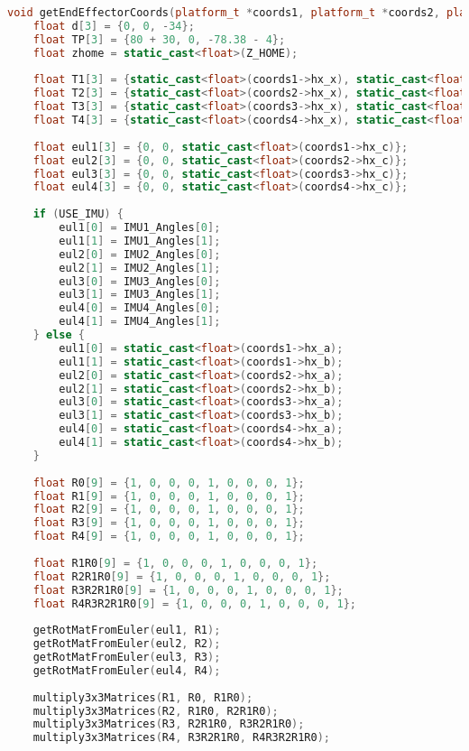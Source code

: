 \documentclass[12pt,a4paper]{report}
\begin{document}
\begin{lstlisting}[language=C++]
void getEndEffectorCoords(platform_t *coords1, platform_t *coords2, platform_t *coords3, platform_t *coords4, bool USE_IMU){
	float d[3] = {0, 0, -34};
	float TP[3] = {80 + 30, 0, -78.38 - 4};
	float zhome = static_cast<float>(Z_HOME);
	
	float T1[3] = {static_cast<float>(coords1->hx_x), static_cast<float>(coords1->hx_y), static_cast<float>(coords1->hx_z) + zhome};
	float T2[3] = {static_cast<float>(coords2->hx_x), static_cast<float>(coords2->hx_y), static_cast<float>(coords2->hx_z) + zhome};
	float T3[3] = {static_cast<float>(coords3->hx_x), static_cast<float>(coords3->hx_y), static_cast<float>(coords3->hx_z) + zhome};
	float T4[3] = {static_cast<float>(coords4->hx_x), static_cast<float>(coords4->hx_y), static_cast<float>(coords4->hx_z) + zhome};
	
	float eul1[3] = {0, 0, static_cast<float>(coords1->hx_c)};
	float eul2[3] = {0, 0, static_cast<float>(coords2->hx_c)};
	float eul3[3] = {0, 0, static_cast<float>(coords3->hx_c)};
	float eul4[3] = {0, 0, static_cast<float>(coords4->hx_c)};
	
	if (USE_IMU) {
		eul1[0] = IMU1_Angles[0];
		eul1[1] = IMU1_Angles[1];
		eul2[0] = IMU2_Angles[0];
		eul2[1] = IMU2_Angles[1];
		eul3[0] = IMU3_Angles[0];
		eul3[1] = IMU3_Angles[1];
		eul4[0] = IMU4_Angles[0];
		eul4[1] = IMU4_Angles[1];
	} else {
		eul1[0] = static_cast<float>(coords1->hx_a);
		eul1[1] = static_cast<float>(coords1->hx_b);
		eul2[0] = static_cast<float>(coords2->hx_a);
		eul2[1] = static_cast<float>(coords2->hx_b);
		eul3[0] = static_cast<float>(coords3->hx_a);
		eul3[1] = static_cast<float>(coords3->hx_b);
		eul4[0] = static_cast<float>(coords4->hx_a);
		eul4[1] = static_cast<float>(coords4->hx_b);
	}
	
	float R0[9] = {1, 0, 0, 0, 1, 0, 0, 0, 1};
	float R1[9] = {1, 0, 0, 0, 1, 0, 0, 0, 1};
	float R2[9] = {1, 0, 0, 0, 1, 0, 0, 0, 1};
	float R3[9] = {1, 0, 0, 0, 1, 0, 0, 0, 1};
	float R4[9] = {1, 0, 0, 0, 1, 0, 0, 0, 1};
	
	float R1R0[9] = {1, 0, 0, 0, 1, 0, 0, 0, 1};
	float R2R1R0[9] = {1, 0, 0, 0, 1, 0, 0, 0, 1};
	float R3R2R1R0[9] = {1, 0, 0, 0, 1, 0, 0, 0, 1};
	float R4R3R2R1R0[9] = {1, 0, 0, 0, 1, 0, 0, 0, 1};
	
	getRotMatFromEuler(eul1, R1);
	getRotMatFromEuler(eul2, R2);
	getRotMatFromEuler(eul3, R3);
	getRotMatFromEuler(eul4, R4);
	
	multiply3x3Matrices(R1, R0, R1R0);
	multiply3x3Matrices(R2, R1R0, R2R1R0);
	multiply3x3Matrices(R3, R2R1R0, R3R2R1R0);
	multiply3x3Matrices(R4, R3R2R1R0, R4R3R2R1R0);
	

\end{lstlisting}
\end{document}
